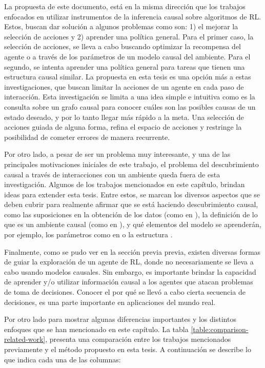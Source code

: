 La propuesta de este documento, está en la misma dirección que los trabajos enfocados en 
utilizar instrumentos de la inferencia causal sobre algoritmos de RL. Estos, buscan dar solución a algunos problemas como son: 1) el mejorar la
selección de acciones y 2) aprender una política general. Para el primer caso, 
la selección de acciones, se lleva a cabo buscando optimizar la recompensa del agente o a través de los parámetros de un modelo causal del ambiente.
Para el segundo, se intenta aprender una política general para tareas que tienen
una estructura causal similar.
La propuesta en esta tesis es una opción más 
a estas investigaciones, que buscan
limitar la acciones de un agente
en cada paso de interacción. Esta investigación se limita a una idea simple e intuitiva como
es la consulta sobre un grafo causal para conocer cuáles son las posibles causas de un estado deseado, y por lo tanto llegar más rápido a la meta.
Una selección de acciones guiada de alguna forma, refina el espacio de 
acciones y restringe la posibilidad de cometer errores de manera recurrente.

Por otro lado, a pesar de ser un problema muy interesante,
y una de las principales motivaciones iniciales de este trabajo,
el problema del descubrimiento causal a través de interacciones con un ambiente queda fuera
de esta investigación. Algunos de los trabajos mencionados en este capítulo, brindan ideas para extender esta tesis. Entre estos, se 
marcan los diversos aspectos que se deben cubrir para
realmente afirmar que se está haciendo descubrimiento causal, como
las suposiciones en la obtención de los datos (como en \cite{zhu2019causal, dasgupta2019causal}), la definición
de lo que es un ambiente causal (como en \cite{gonzalezsoto2019von}), y 
qué elementos del modelo se aprenderán, por ejemplo, los parámetros como en \cite{lattimore2016causal}
o la estructura \cite{gonzalezsoto2020causal}.


Finalmente, como se pudo ver en la sección previa previa, 
existen diversas formas de guiar la exploración de un agente de RL, 
donde no necesariamente se lleva a cabo usando modelos causales. 
Sin embargo, es importante brindar la capacidad de aprender y/o
utilizar información causal a los agentes que atacan problemas de toma de decisiones. 
Conocer el por qué se llevó a cabo cierta secuencia de decisiones, 
es una parte importante en aplicaciones del mundo real.

Por otro lado para mostrar algunas diferencias importantes y los distintos enfoques que se han mencionado en este capítulo. La tabla \ref{table:comparison-related-work}, presenta una comparación entre los trabajos mencionados previamente y el método propuesto en esta tesis. A continuación se describe lo que indica cada una de las columnas:

